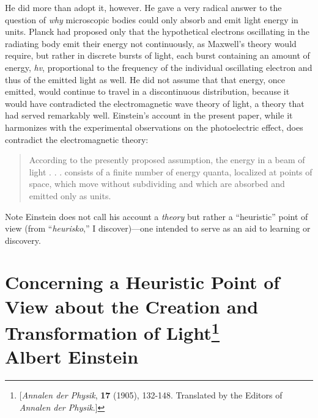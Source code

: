 He did more than adopt it, however. He gave a very radical answer to the
question of \emph{why} microscopic bodies could only absorb and emit
light energy in units. Planck had proposed only that the hypothetical
electrons oscillating in the radiating body emit their energy not
continuously, as Maxwell's theory would require, but rather in discrete
bursts of light, each burst containing an amount of energy, \emph{hv},
proportional to the frequency of the individual oscillating electron and
thus of the emitted light as well. He did not assume that that energy,
once emitted, would continue to travel in a discontinuous distribution,
because it would have contradicted the electromagnetic wave theory of
light, a theory that had served remarkably well. Einstein's account in
the present paper, while it harmonizes with the experimental
observations on the photoelectric effect, does contradict the
electromagnetic theory:

\begin{quote}
According to the presently proposed assumption, the energy in a beam of
light . . . consists of a finite number of energy quanta, localized at
points of space, which move without subdividing and which are absorbed
and emitted only as units.
\end{quote}

Note Einstein does not call his account a \emph{theory} but rather a
``heuristic'' point of view (from ``\emph{heurisko},'' I discover)---one
intended to serve as an aid to learning or discovery.


\section*{Concerning a Heuristic Point of View about the
Creation and Transformation of Light\footnote{{[}\emph{Annalen der
  Physik}, \textbf{17} (1905), 132-148. Translated by the Editors of
  \emph{Annalen der Physik}.{]}}\\
  {\large Albert Einstein}}

